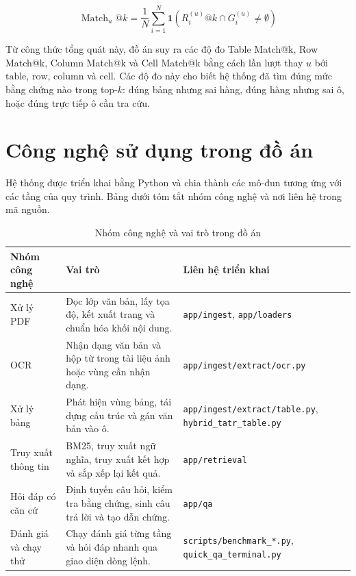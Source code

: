 \documentclass[../DoAn.tex]{subfiles}
\begin{document}
\begin{equation}
\label{eq:unit-match-at-k}
\operatorname{Match}_{u}@k =
\frac{1}{N}
\sum_{i=1}^{N}
\mathbf{1}\left(R_i^{(u)}@k \cap G_i^{(u)} \neq \emptyset\right)
\end{equation}

Từ công thức tổng quát này, đồ án suy ra các độ đo Table Match@k, Row Match@k,
Column Match@k và Cell Match@k bằng cách lần lượt thay \(u\) bởi
\(\text{table}\), \(\text{row}\), \(\text{column}\) và \(\text{cell}\). Các độ đo
này cho biết hệ thống đã tìm đúng mức bằng chứng nào trong top-\(k\): đúng bảng
nhưng sai hàng, đúng hàng nhưng sai ô, hoặc đúng trực tiếp ô cần tra cứu.

\section{Công nghệ sử dụng trong đồ án}
\label{section:technology-foundation}

Hệ thống được triển khai bằng Python và chia thành các mô-đun tương ứng với các
tầng của quy trình. Bảng dưới tóm tắt nhóm công nghệ và nơi liên hệ trong mã nguồn.

\begin{table}[H]
\centering
\small
\renewcommand{\arraystretch}{1.15}
\caption{Nhóm công nghệ và vai trò trong đồ án}
\label{tab:chapter3-technology-summary}
\begin{tabularx}{\textwidth}{
    |>{\raggedright\arraybackslash}p{}
    |>{\raggedright\arraybackslash}p{}
    |>{\raggedright\arraybackslash}X|
}
\hline
\textbf{Nhóm công nghệ} & \textbf{Vai trò} & \textbf{Liên hệ triển khai} \\
\hline
Xử lý PDF &
Đọc lớp văn bản, lấy tọa độ, kết xuất trang và chuẩn hóa khối nội dung. &
\texttt{app/ingest}, \texttt{app/loaders} \\
\hline
OCR &
Nhận dạng văn bản và hộp từ trong tài liệu ảnh hoặc vùng cần nhận dạng. &
\texttt{app/ingest/extract/ocr.py} \\
\hline
Xử lý bảng &
Phát hiện vùng bảng, tái dựng cấu trúc và gán văn bản vào ô. &
\texttt{app/ingest/extract/table.py}, \texttt{hybrid\_tatr\_table.py} \\
\hline
Truy xuất thông tin &
BM25, truy xuất ngữ nghĩa, truy xuất kết hợp và sắp xếp lại kết quả. &
\texttt{app/retrieval} \\
\hline
Hỏi đáp có căn cứ &
Định tuyến câu hỏi, kiểm tra bằng chứng, sinh câu trả lời và tạo dẫn chứng. &
\texttt{app/qa} \\
\hline
Đánh giá và chạy thử &
Chạy đánh giá từng tầng và hỏi đáp nhanh qua giao diện dòng lệnh. &
\texttt{scripts/benchmark\_*.py}, \texttt{quick\_qa\_terminal.py} \\
\hline
\end{tabularx}
\end{table}
\end{document}

